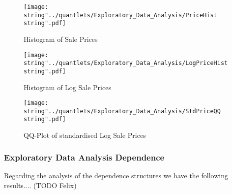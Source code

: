 \begin{figure}
  \centering
\texttt{[image: \\string"../quantlets/Exploratory\_Data\_Analysis/PriceHist\\string".pdf]}
  \caption{Histogram of Sale Prices}\label{fig:pricehist}
\end{figure}

\begin{figure}
  \centering
\texttt{[image: \\string"../quantlets/Exploratory\_Data\_Analysis/LogPriceHist\\string".pdf]}
  \caption{Histogram of Log Sale Prices}\label{fig:logpricehist}
\end{figure}

\begin{figure}
  \centering
\texttt{[image: \\string"../quantlets/Exploratory\_Data\_Analysis/StdPriceQQ\\string".pdf]}
  \caption{QQ-Plot of standardised Log Sale Prices}\label{fig:stdpriceqq}
\end{figure}






\subsubsection{Exploratory Data Analysis Dependence}
Regarding the analysis of the dependence structures we have the following results....
(TODO Felix)